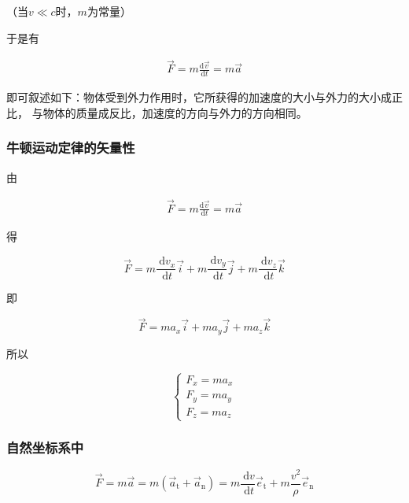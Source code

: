 \documentclass[
	12pt, %
	a4paper, %
]{myLegrandOrangeBook}
\newcommand{\rmd}{\mathrm{d}}
\newcommand{\deriv}[2]{\frac{\rmd #1}{\rmd #2}}
\begin{document}
    （当\(v\ll c\)时，\(m\)为常量）

    于是有

    \begin{align}
        \overrightarrow{F} = m \deriv{\overrightarrow{v}}{t} = m \overrightarrow{a}
    \end{align}

    即可叙述如下：物体受到外力作用时，它所获得的加速度的大小与外力的大小成正比，
    与物体的质量成反比，加速度的方向与外力的方向相同。

\subsubsection*{牛顿运动定律的矢量性}

    由

    \begin{align*}
        \overrightarrow{F} = m \deriv{\overrightarrow{v}}{t} = m \overrightarrow{a}
    \end{align*}

    得

    \begin{equation}
        \overrightarrow{F}=m \frac{\mathrm{~d} v_x}{\mathrm{~d} t} \overrightarrow{i}+m \frac{\mathrm{~d} v_y}{\mathrm{~d} t} \overrightarrow{j}+m \frac{\mathrm{~d} v_z}{\mathrm{~d} t} \overrightarrow{k}
    \end{equation}

    即

    \begin{equation}
        \overrightarrow{F}=m a_x \overrightarrow{i}+m a_y \overrightarrow{j}+m a_z \overrightarrow{k}
    \end{equation}

    所以

    \begin{equation}
        \left\{\begin{array}{l}
        F_x=m a_x \\
        F_y=m a_y \\
        F_z=m a_z
        \end{array}\right.
    \end{equation}

\subsubsection*{自然坐标系中}

    \begin{equation}
        \overrightarrow{F}=m \overrightarrow{a}=
        m\left(\overrightarrow{a}_{\mathrm{t}}+\overrightarrow{a}_{\mathrm{n}}\right)=
        m \frac{\mathrm{~d} v}{\mathrm{~d} t} \overrightarrow{e}_{\mathrm{t}}+m \frac{v^2}{\rho} \overrightarrow{e}_{\mathrm{n}}
    \end{equation}
\end{document}
